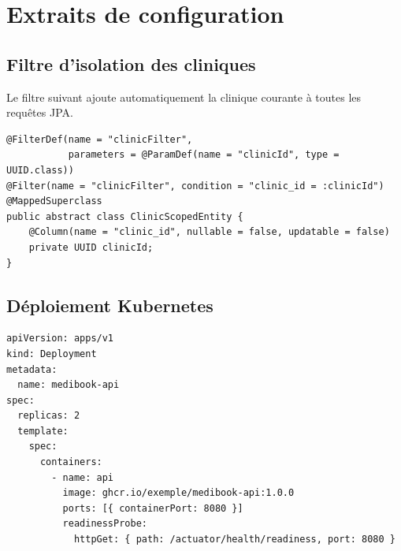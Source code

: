 \chapter{Extraits de configuration}\label{annexe:configuration}


\section{Filtre d'isolation des cliniques}
Le filtre suivant ajoute automatiquement la clinique courante à toutes les requêtes JPA.

\begin{small}
\begin{verbatim}
@FilterDef(name = "clinicFilter",
           parameters = @ParamDef(name = "clinicId", type = UUID.class))
@Filter(name = "clinicFilter", condition = "clinic_id = :clinicId")
@MappedSuperclass
public abstract class ClinicScopedEntity {
    @Column(name = "clinic_id", nullable = false, updatable = false)
    private UUID clinicId;
}
\end{verbatim}
\end{small}

\section{Déploiement Kubernetes}
\begin{small}
\begin{verbatim}
apiVersion: apps/v1
kind: Deployment
metadata:
  name: medibook-api
spec:
  replicas: 2
  template:
    spec:
      containers:
        - name: api
          image: ghcr.io/exemple/medibook-api:1.0.0
          ports: [{ containerPort: 8080 }]
          readinessProbe:
            httpGet: { path: /actuator/health/readiness, port: 8080 }
\end{verbatim}
\end{small}
